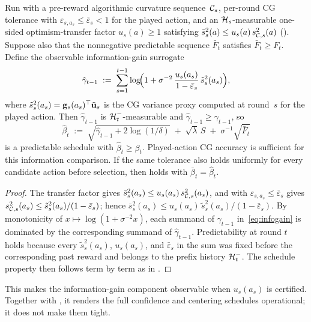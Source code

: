 \begin{corollary}\label{cor:gammahat}
Run  with a pre-reward algorithmic curvature
sequence~$\mathcal{C}_s$, per-round CG tolerance with
$\varepsilon_{s,a_s}\le\bar\varepsilon_s<1$ for the played action, and an
$\mathcal{H}_s$-measurable one-sided optimism-transfer factor $u_s(a)\ge1$ satisfying
$\bar s_s^2(a)\le u_s(a)\,s_{\mathcal{C},s}^2(a)$ ().
Suppose also that the nonnegative predictable sequence $\bar F_t$ satisfies
$\bar F_t\ge F_t$.
Define the observable information-gain surrogate
\[
  \hat\gamma_{t-1} \;:=\;
  \sum_{s=1}^{t-1}\log\!\Bigl(1+\sigma^{-2}\,
  \frac{u_s(a_s)}{1-\bar\varepsilon_s}\,
  \tilde s_s^2(a_s)\Bigr),
\]
where $\tilde s_s^2(a_s)=\mathbf{g}_s(a_s)^\top\tilde{\mathbf{u}}_s$ is the CG variance
proxy computed at round~$s$ for the played action.
Then $\hat\gamma_{t-1}$ is $\mathcal{H}_t^-$-measurable and
$\hat\gamma_{t-1}\ge\gamma_{t-1}$, so
\[
  \hat\beta_t \;:=\;
  \sqrt{\hat\gamma_{t-1}+2\log(1/\delta)}
  \;+\;\sqrt{\lambda}\,S
  \;+\;\sigma^{-1}\sqrt{\bar F_t}
\]
is a predictable schedule with $\hat\beta_t\ge\beta_t$.  Played-action CG
accuracy is sufficient for this information comparison.  If the same tolerance
also holds uniformly for every candidate action before selection, then
 holds with $\bar\beta_t=\hat\beta_t$.
\end{corollary}
\begin{proof}
The transfer factor gives
$\bar s_s^2(a_s)\le u_s(a_s)\,s_{\mathcal{C},s}^2(a_s)$, and 
with $\varepsilon_{s,a_s}\le\bar\varepsilon_s$ gives
$s_{\mathcal{C},s}^2(a_s)\le\tilde s_s^2(a_s)/(1-\bar\varepsilon_s)$;
hence
$\bar s_s^2(a_s)\le u_s(a_s)\,\tilde s_s^2(a_s)/(1-\bar\varepsilon_s)$.
By monotonicity of $x\mapsto\log(1+\sigma^{-2}x)$, each summand of
$\gamma_{t-1}$ in~\eqref{eq:infogain} is dominated by the corresponding
summand of $\hat\gamma_{t-1}$.
Predictability at round $t$ holds because every
$\tilde s_s^2(a_s)$, $u_s(a_s)$, and $\bar\varepsilon_s$ in the sum was
fixed before the corresponding past reward and belongs to the prefix history
$\mathcal{H}_t^-$.
The schedule property then follows term by term as in
.
\end{proof}

\noindent
This makes the information-gain component observable when $u_s(a_s)$ is
certified.  Together with , it renders the full
confidence and centering schedules operational; it does not make them tight.

